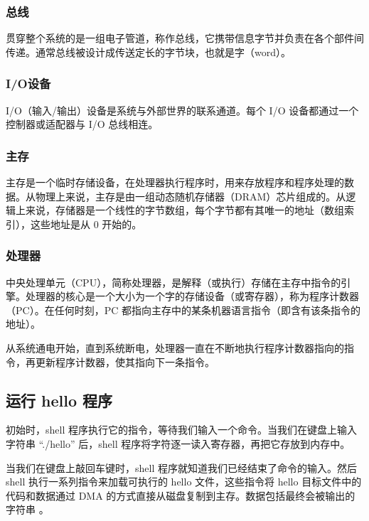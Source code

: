 \subsubsection{总线}

贯穿整个系统的是一组电子管道，称作总线，它携带信息字节并负责在各个部件间传递。通常总线被设计成传送定长的字节块，也就是字（word）。

\subsubsection{I/O设备}

I/O（输入/输出）设备是系统与外部世界的联系通道。每个 I/O 设备都通过一个控制器或适配器与 I/O 总线相连。

\subsubsection{主存}

主存是一个临时存储设备，在处理器执行程序时，用来存放程序和程序处理的数据。从物理上来说，主存是由一组动态随机存储器（DRAM）芯片组成的。从逻辑上来说，存储器是一个线性的字节数组，每个字节都有其唯一的地址（数组索引），这些地址是从 0 开始的。

\subsubsection{处理器}

中央处理单元（CPU），简称处理器，是解释（或执行）存储在主存中指令的引擎。处理器的核心是一个大小为一个字的存储设备（或寄存器），称为程序计数器（PC）。在任何时刻，PC 都指向主存中的某条机器语言指令（即含有该条指令的地址）。

从系统通电开始，直到系统断电，处理器一直在不断地执行程序计数器指向的指令，再更新程序计数器，使其指向下一条指令。

\subsection{运行 hello 程序}

初始时，shell 程序执行它的指令，等待我们输入一个命令。当我们在键盘上输入字符串 ``./hello'' 后，shell 程序将字符逐一读入寄存器，再把它存放到内存中。

当我们在键盘上敲回车键时，shell 程序就知道我们已经结束了命令的输入。然后 shell 执行一系列指令来加载可执行的 hello 文件，这些指令将 hello 目标文件中的代码和数据通过 DMA 的方式直接从磁盘复制到主存。数据包括最终会被输出的字符串 。

